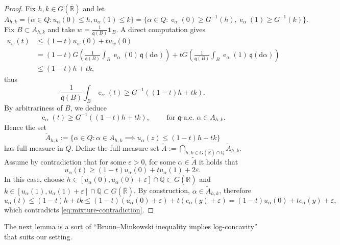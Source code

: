 \documentclass[12pt,a4paper]{amsart}
\theoremstyle{plain}
\theoremstyle{definition}
\numberwithin{equation}{section}
\let\temp\phi
\let\phi\varphi
\let\temp\epsilon
\let\epsilon\varepsilon
\let\varepsilon\temp
\newcommand{\R}{\mathbb{R}}
\newcommand{\Q}{\mathbb{Q}}
\DeclareMathOperator{\ee}{e}
\newcommand{\de}{{\mathrm{d}}}
\newcommand{\q}{\mathfrak{q}}
\newcommand{\indicator}{\mathbf{1}}
\begin{document}
\begin{proof}
  Fix $h,k\in G(\overline{\R})$ and let
  \begin{equation*}
    A_{h,k}
    =
    \{
    \alpha\in Q
    :
    u_\alpha(0)\leq h
    ,
    u_\alpha(1)\leq k
    \}
    =
    \{
    \alpha\in Q
    :
    \ee_\alpha(0)\geq G^{-1}(h)
    ,
    \ee_\alpha(1)\geq G^{-1}(k)
    \}
    .
  \end{equation*}
  Fix $B\subset A_{h,k}$ and take $w=\frac{1}{\q(B)}\indicator_B$.
  A direct computation gives
  \begin{align*}
    u_w(t)
    &
      \leq
      (1-t) u_w(0) + tu_w(0)
    \\
    &
      =
      (1-t)G
      \left(
      \frac{1}{\q(B)}
      \int_{B} \ee_\alpha(0)\,\q(\de\alpha)
      \right)
      +
      tG
      \left(
      \frac{1}{\q(B)}
      \int_{B} \ee_\alpha(1)\,\q(\de\alpha)
      \right)
    \\
    &
      \leq
      (1-t) h+ t k
      ,
  \end{align*}
thus
$$
    \frac{1}{\q(B)}
    \int_B \ee_\alpha(t)
    \geq
    G^{-1}
    \left(
      (1-t) h +t k
    \right)
    .
$$
%
By arbitrariness of $B$, we deduce
$$
    \ee_\alpha(t)
    \geq
    G^{-1}
    \left(
      (1-t) h +t k
    \right)
    ,
    \qquad
    \text{ for $\q$-a.e.\ }
    \alpha\in A_{h,k}
    .
$$
%
Hence the set
$$
    \tilde A_{h,k}
    :=
    \{
    \alpha\in Q:
    \alpha \in A_{h,k}
    \implies
    u_\alpha(z)\leq (1-t) h+t k
    \}
$$
has full measure in $Q$.
  Define the full-measure set
  $\tilde A:=\bigcap_{h,k\in G(\overline{\R})\cap \Q} \tilde A_{h,k}$.
  Assume by contradiction that for some $\epsilon>0$, for some
  $\alpha\in \tilde A$ it holds that
  \begin{equation}
    \label{eq:mixture-contradiction}
    u_\alpha(t) \geq
    (1-t) u_\alpha(0)
    +
    t u_\alpha(1)
    +2\epsilon
    .
  \end{equation}
  In this case, choose $h\in [u_\alpha(0),u_\alpha(0)+\epsilon]\cap \Q
  \subset G(\overline{\R})$ and
  $k\in [u_\alpha(1),u_\alpha(1)+\epsilon]\cap \Q \subset G(\overline{\R})$.
  By construction, $\alpha\in \tilde A_{h,k}$, therefore
$$
    u_\alpha(t)\leq (1-t) h+t k
    \leq
    (1-t) (u_\alpha(0)+\epsilon)+t (e_\alpha(y)+\epsilon)
    =
    (1-t) u_\alpha(0)+t e_\alpha(y)+\epsilon
    ,
$$
which contradicts 
\eqref{eq:mixture-contradiction}.
\end{proof}


The next lemma is a sort of ``Brunn--Minkowski inequality implies
log-concavity'' that suits our setting.
\end{document}
